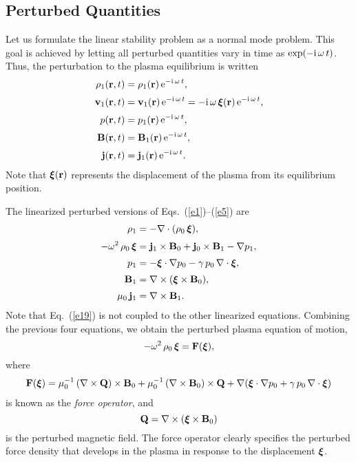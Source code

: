 \documentclass[12pt,prb,aps,notitlepage]{revtex4-1}
\newcommand{\bxi}{\mbox{\boldmath$\xi$}}
\begin{document}
\subsection{Perturbed Quantities}
Let us formulate the linear stability problem as a normal mode problem. This goal is
achieved by letting all perturbed quantities vary in time as $\exp(-{\rm i}\,\omega\,t)$. 
Thus, the perturbation to the plasma equilibrium  is written
\begin{align}
\rho_1({\bf r},t) &= \rho_1({\bf r})\,{\rm e}^{-{\rm i}\,\omega\,t},\\[0.5ex]
{\bf v}_1({\bf r},t) &={\bf v}_1({\bf r})\,{\rm e}^{-{\rm i}\,\omega\,t}=  {-{\rm i}\,\omega}\,\bxi({\bf r})\,{\rm e}^{-{\rm i}\,\omega\,t},\label{e15}\\[0.5ex]
p({\bf r},t) &= p_1({\bf r})\,{\rm e}^{-{\rm i}\,\omega\,t},\\[0.5ex]
{\bf B}({\bf r},t) &= {\bf B}_1({\bf r})\,{\rm e}^{-{\rm i}\,\omega\,t},\\[0.5ex]
{\bf j}({\bf r},t) &= {\bf j}_1({\bf r})\,{\rm e}^{-{\rm i}\,\omega\,t}.
\end{align}
Note that $\bxi({\bf r})$ represents the displacement of the plasma from its equilibrium position.

The linearized perturbed versions of  Eqs.~(\ref{e1})--(\ref{e5}) are
\begin{align}\label{e19}
\rho_1 &=-\nabla\cdot(\rho_0\,\bxi),\\[0.5ex]
-\omega^2\,\rho_0\,\bxi &=  {\bf j}_1\times {\bf B}_0 + {\bf j}_0\times {\bf B}_1-\nabla p_1,\\[0.5ex]
p_1&= - \bxi\cdot\nabla p_0-\gamma\,p_0\,\nabla\cdot\bxi,\\[0.5ex]
{\bf B}_1 &=\nabla\times (\bxi\times {\bf B}_0),\label{e22}\\[0.5ex]
\mu_0\,{\bf j}_1&= \nabla\times {\bf B}_1.
\end{align}
Note that Eq.~(\ref{e19}) is not coupled to the other linearized equations. 
Combining the previous four equations, we obtain the perturbed plasma equation of motion, 
\begin{equation}\label{e24a}
-\omega^2\,\rho_0\,\bxi= {\bf F}(\bxi),
\end{equation}
where
\begin{align}\label{e24}
{\bf F}(\bxi) = \mu_0^{-1}\,(\nabla\times {\bf Q})\times{\bf B}_0+ \mu_0^{-1}\, (\nabla\times {\bf B}_0)\times {\bf Q} + 
\nabla(\bxi\cdot \nabla p_0 + \gamma\,p_0\,\nabla\cdot\bxi)
\end{align}
is known as the {\em force operator}, 
and
\begin{equation}\label{e25}
{\bf Q} = \nabla\times (\bxi\times {\bf B}_0)
\end{equation}
is the perturbed magnetic field. The force operator clearly specifies the perturbed force density that develops in the plasma in
response to the displacement $\bxi$. 
\end{document}
